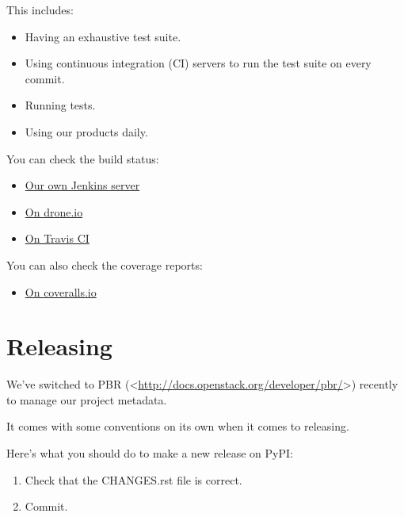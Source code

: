 \documentclass[a4paper,12pt,english]{sphinxmanual}
\begin{document}
This includes:
\begin{itemize}
\item {} 
Having an exhaustive test suite.

\item {} 
Using continuous integration (CI) servers to run the test suite on every commit.

\item {} 
Running tests.

\item {} 
Using our products daily.

\end{itemize}

You can check the build status:
\begin{itemize}
\item {} 
\href{http://jenkins.abilian.com/job/Abilian-Core/}{Our own Jenkins server}

\item {} 
\href{https://drone.io/github.com/abilian/abilian-core/latest}{On drone.io}

\item {} 
\href{https://travis-ci.org/abilian/abilian-core}{On Travis CI}

\end{itemize}

You can also check the coverage reports:
\begin{itemize}
\item {} 
\href{https://coveralls.io/r/abilian/abilian-core?branch=master}{On coveralls.io}

\end{itemize}


\section{Releasing}
\label{contributing:releasing}
We've switched to PBR (\textless{}\href{http://docs.openstack.org/developer/pbr/}{http://docs.openstack.org/developer/pbr/}\textgreater{}) recently
to manage our project metadata.

It comes with some conventions on its own when it comes to releasing.

Here's what you should do to make a new release on PyPI:
\begin{enumerate}
\item {} 
Check that the CHANGES.rst file is correct.

\item {} 
Commit.

\end{enumerate}
\end{document}
